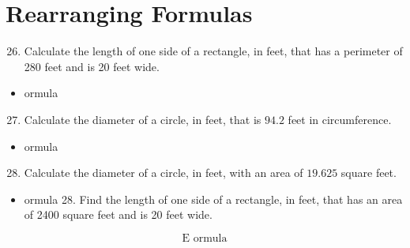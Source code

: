 \documentclass[10pt]{article}
\begin{document}
\section{Rearranging Formulas}
\begin{enumerate}
  \setcounter{enumi}{25}
  \item Calculate the length of one side of a rectangle, in feet, that has a perimeter of 280 feet and is 20 feet wide.
\end{enumerate}
\begin{itemize}
  \item ormula
\end{itemize}
\begin{enumerate}
  \setcounter{enumi}{26}
  \item Calculate the diameter of a circle, in feet, that is $94.2$ feet in circumference.
\end{enumerate}
\begin{itemize}
  \item ormula
\end{itemize}
\begin{enumerate}
  \setcounter{enumi}{27}
  \item Calculate the diameter of a circle, in feet, with an area of $19.625$ square feet.
\end{enumerate}
\begin{itemize}
  \item ormula 28. Find the length of one side of a rectangle, in feet, that has an area of 2400 square feet and is 20 feet wide.
\end{itemize}
$$
\text { E ormula }
$$
\end{document}
